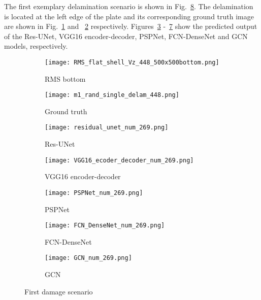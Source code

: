 The first exemplary delamination scenario is shown in Fig.~\ref{fig:softmax_448}. 
The delamination is located at the left edge of the plate and its corresponding ground truth image are shown in Fig.~\ref{fig:RMS_flat_shell_Vz_448} and ~\ref{fig:m1_rand_single_delam_448} respectively. 
Figures~\ref{fig:unet_pred_448} -~\ref{fig:gcn_pred_448} show the predicted output of the Res-UNet, VGG16 encoder-decoder, PSPNet, FCN-DenseNet and GCN models, respectively. 
\begin{figure} [!h]
	\centering
	\begin{subfigure}[b]{0.47\textwidth}
		\centering
		\texttt{[image: RMS\_flat\_shell\_Vz\_448\_500x500bottom.png]}
		\caption{RMS bottom}
		\label{fig:RMS_flat_shell_Vz_448}
	\end{subfigure}
	\hfill
	\begin{subfigure}[b]{0.47\textwidth}
		\centering
		\texttt{[image: m1\_rand\_single\_delam\_448.png]}
		\caption{Ground truth}
		\label{fig:m1_rand_single_delam_448}
	\end{subfigure}
	\begin{subfigure}[b]{0.47\textwidth}
		\centering
		\texttt{[image: residual\_unet\_num\_269.png]}
		\caption{Res-UNet}
		\label{fig:unet_pred_448}
	\end{subfigure}
	\hfill
	\begin{subfigure}[b]{0.47\textwidth}
		\centering
		\texttt{[image: VGG16\_ecoder\_decoder\_num\_269.png]}
		\caption{VGG16 encoder-decoder}
		\label{fig:vgg16_pred_448}
	\end{subfigure}
	\hfill
	\begin{subfigure}[b]{0.47\textwidth}
		\centering
		\texttt{[image: PSPNet\_num\_269.png]}
		\caption{PSPNet}
		\label{fig:pspnet_pred_448}
	\end{subfigure}
	\hfill
	\begin{subfigure}[b]{0.47\textwidth}
		\centering
		\texttt{[image: FCN\_DenseNet\_num\_269.png]}
		\caption{FCN-DenseNet}
		\label{fig:fcn_densenet_pred_448}
	\end{subfigure}
	\hfill
	\begin{subfigure}[b]{0.47\textwidth}
		\centering
		\texttt{[image: GCN\_num\_269.png]}
		\caption{GCN}
		\label{fig:gcn_pred_448}
	\end{subfigure}

	\caption{First damage scenario}
	\label{fig:softmax_448}
\end{figure} 
